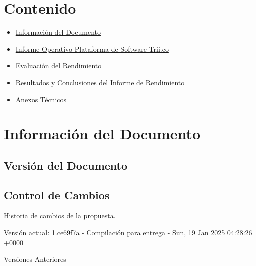 \documentclass[
  paper=a4,
  ,captions=tableheading
]{scrartcl}
\providecommand{\tightlist}{%
  \setlength{\itemsep}{0pt}\setlength{\parskip}{0pt}}
\renewenvironment{quote}{\begin{customblockquote}\list{}{\rightmargin=0em\leftmargin=0em}%
\item\relax\color{blockquote-text}\ignorespaces}{\unskip\unskip\endlist\end{customblockquote}}
\begin{document}



\section{Contenido}\label{sec:contenido}

\begin{itemize}
\tightlist
\item
  \hyperref[informaciuxf3n-del-documento]{Información del Documento}
\item
  \hyperref[informe-operativo-plataforma-de-software-trii.co]{Informe
  Operativo Plataforma de Software Trii.co}
\item
  \hyperref[evaluaciuxf3n-del-rendimiento]{Evaluación del Rendimiento}
\item
  \hyperref[resultados-y-conclusiones-del-informe-de-rendimiento]{Resultados
  y Conclusiones del Informe de Rendimiento}
\item
  \hyperref[anexos-tuxe9cnicos]{Anexos Técnicos}
\end{itemize}

\newpage

\section{Información del
Documento}\label{sec:informaciuxf3n-del-documento}

\subsection{Versión del Documento}\label{sec:versiuxf3n-del-documento}

\begin{quote}
\end{quote}

\subsection{Control de Cambios}\label{sec:control-de-cambios}

Historia de cambios de la propuesta.

Versión actual: 1.ce69f7a - Compilación para entrega - Sun, 19 Jan 2025
04:28:26 +0000

Versiones Anteriores
\end{document}
